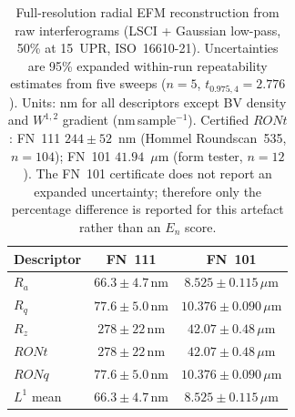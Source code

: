 \documentclass[review]{elsarticle}
\providecommand{\DIFaddtex}[1]{{\protect\color{blue}\uwave{#1}}} %
\providecommand{\DIFdeltex}[1]{{\protect\color{red}\sout{#1}}}                      %
\providecommand{\DIFaddFL}[1]{\DIFadd{#1}} %
\providecommand{\DIFdelFL}[1]{\DIFdel{#1}} %
\providecommand{\DIFaddbeginFL}{} %
\providecommand{\DIFaddendFL}{} %
\providecommand{\DIFdelbeginFL}{} %
\providecommand{\DIFdelendFL}{} %
\providecommand{\DIFadd}[1]{\texorpdfstring{\DIFaddtex{#1}}{#1}} %
\providecommand{\DIFdel}[1]{\texorpdfstring{\DIFdeltex{#1}}{}} %
\newcommand{\DIFscaledelfig}{0.5}
\newlength{\DIFdelgraphicswidth} %
\newlength{\DIFdelgraphicsheight} %
\newcommand{\DIFaddincludegraphics}[2][]{{\color{blue}\fbox{\DIFOincludegraphics[#1]{#2}}}} %
\newcommand{\DIFdelincludegraphics}[2][]{%
\sbox{\DIFdelgraphicsbox}{\DIFOincludegraphics[#1]{#2}}%
\settoboxwidth{\DIFdelgraphicswidth}{\DIFdelgraphicsbox} %
\settoboxtotalheight{\DIFdelgraphicsheight}{\DIFdelgraphicsbox} %
\scalebox{\DIFscaledelfig}{%
\parbox[b]{\DIFdelgraphicswidth}{\usebox{\DIFdelgraphicsbox}\\[-\baselineskip] \rule{\DIFdelgraphicswidth}{0em}}\llap{\resizebox{\DIFdelgraphicswidth}{\DIFdelgraphicsheight}{%
\setlength{\unitlength}{\DIFdelgraphicswidth}%
\begin{picture}(1,1)%
\thicklines\linethickness{2pt} %
{\color[rgb]{1,0,0}\put(0,0){\framebox(1,1){}}}%
{\color[rgb]{1,0,0}\put(0,0){\line( 1,1){1}}}%
{\color[rgb]{1,0,0}\put(0,1){\line(1,-1){1}}}%
\end{picture}%
}\hspace*{3pt}}} %
} %
\DeclareRobustCommand{\DIFaddbeginFL}{\DIFOaddbeginFL \let\includegraphics\DIFaddincludegraphics} %
\DeclareRobustCommand{\DIFaddendFL}{\DIFOaddendFL \let\includegraphics\DIFOincludegraphics} %
\DeclareRobustCommand{\DIFdelbeginFL}{\DIFOdelbeginFL \let\includegraphics\DIFdelincludegraphics} %
\DeclareRobustCommand{\DIFdelendFL}{\DIFOaddendFL \let\includegraphics\DIFOincludegraphics} %
\begin{document}
\begin{table}[htbp]
\centering
\footnotesize
\setlength{\tabcolsep}{4pt}
\caption{Full-resolution radial EFM reconstruction from raw interferograms (LSCI + Gaussian low-pass, 50\% at 15~UPR, ISO~16610-21\DIFaddbeginFL \DIFaddFL{:2025}\DIFaddendFL ). Uncertainties are 95\% expanded within-run repeatability estimates from five sweeps ($n=5$, $t_{0.975,4}=2.776$). Units: nm for all descriptors except BV density and $W^{1,2}$ gradient (nm\,sample$^{-1}$). Certified $RONt$: FN~111 $244 \pm 52$~nm (Hommel Roundscan~535, $n=104$); FN~101 $41.94$~$\mu$m (form tester, $n=12$). The FN~101 certificate does not report an expanded uncertainty; therefore only the percentage difference is reported for this artefact rather than an $E_n$ score.}
\label{tab:metric_phase_reconstruction}
\begin{tabular}{lcc}
\toprule
Descriptor & FN~111 & FN~101 \\
\midrule
$R_a$ & \DIFdelbeginFL \DIFdelFL{$66.3 \pm 4.7$}\DIFdelendFL \DIFaddbeginFL \DIFaddFL{$(66.3 \pm 4.7)$}\DIFaddendFL \,nm & \DIFdelbeginFL \DIFdelFL{$8.525 \pm 0.115$}\DIFdelendFL \DIFaddbeginFL \DIFaddFL{$(8.525 \pm 0.115)$}\DIFaddendFL \,$\mu$m \\
$R_q$ & \DIFdelbeginFL \DIFdelFL{$77.6 \pm 5.0$}\DIFdelendFL \DIFaddbeginFL \DIFaddFL{$(77.6 \pm 5.0)$}\DIFaddendFL \,nm & \DIFdelbeginFL \DIFdelFL{$10.376 \pm 0.090$}\DIFdelendFL \DIFaddbeginFL \DIFaddFL{$(10.376 \pm 0.090)$}\DIFaddendFL \,$\mu$m \\
$R_z$ & \DIFdelbeginFL \DIFdelFL{$278 \pm 22$}\DIFdelendFL \DIFaddbeginFL \DIFaddFL{$(278 \pm 22)$}\DIFaddendFL \,nm & \DIFdelbeginFL \DIFdelFL{$42.07 \pm 0.48$}\DIFdelendFL \DIFaddbeginFL \DIFaddFL{$(42.07 \pm 0.48)$}\DIFaddendFL \,$\mu$m \\
$RONt$ & \DIFdelbeginFL \DIFdelFL{$278 \pm 22$}\DIFdelendFL \DIFaddbeginFL \DIFaddFL{$(278 \pm 22)$}\DIFaddendFL \,nm & \DIFdelbeginFL \DIFdelFL{$42.07 \pm 0.48$}\DIFdelendFL \DIFaddbeginFL \DIFaddFL{$(42.07 \pm 0.48)$}\DIFaddendFL \,$\mu$m \\
$RONq$ & \DIFdelbeginFL \DIFdelFL{$77.6 \pm 5.0$}\DIFdelendFL \DIFaddbeginFL \DIFaddFL{$(77.6 \pm 5.0)$}\DIFaddendFL \,nm & \DIFdelbeginFL \DIFdelFL{$10.376 \pm 0.090$}\DIFdelendFL \DIFaddbeginFL \DIFaddFL{$(10.376 \pm 0.090)$}\DIFaddendFL \,$\mu$m \\
$L^1$ mean & \DIFdelbeginFL \DIFdelFL{$66.3 \pm 4.7$}\DIFdelendFL \DIFaddbeginFL \DIFaddFL{$(66.3 \pm 4.7)$}\DIFaddendFL \,nm & \DIFdelbeginFL \DIFdelFL{$8.525 \pm 0.115$}\DIFdelendFL \DIFaddbeginFL \DIFaddFL{$(8.525 \pm 0.115)$}\DIFaddendFL \,$\mu$m \\

\end{tabular}
\end{table}
\end{document}
